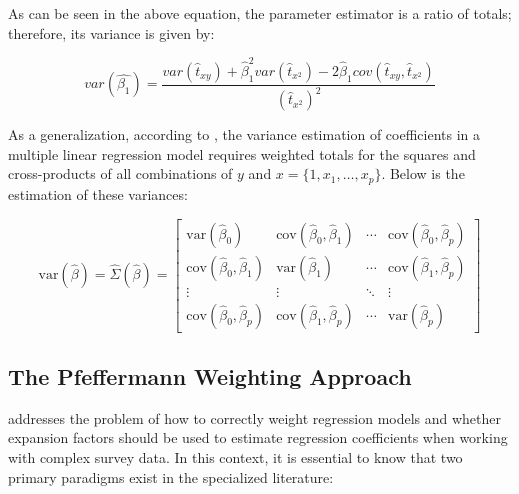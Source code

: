 \documentclass[
  12pt,
]{book}
\begin{document}
As can be seen in the above equation, the parameter estimator is a ratio of totals; therefore, its variance is given by:

\[
var\left(\hat{\beta_{1}}\right)  =  \frac{var\left(\hat{t}_{xy}\right)+\hat{\beta}_{1}^{2}var\left(\hat{t}_{x^{2}}\right)-2\hat{\beta}_{1}cov\left(\hat{t}_{xy},\hat{t}_{x^{2}}\right)}{\left(\hat{t}_{x^{2}}\right)^{2}}
\]

As a generalization, according to \citet{kish1974inference}, the variance estimation of coefficients in a multiple linear regression model requires weighted totals for the squares and cross-products of all combinations of \(y\) and \(x = \{1, x_{1}, \ldots, x_{p}\}\). Below is the estimation of these variances:

\[
\text{var}\left(\hat{\beta}\right) = \hat{\Sigma}\left(\hat{\beta}\right) = 
\begin{bmatrix}
\text{var}\left(\hat{\beta}_{0}\right) & \text{cov}\left(\hat{\beta}_{0},\hat{\beta}_{1}\right) & \cdots & \text{cov}\left(\hat{\beta}_{0},\hat{\beta}_{p}\right) \\
\text{cov}\left(\hat{\beta}_{0},\hat{\beta}_{1}\right) & \text{var}\left(\hat{\beta}_{1}\right) & \cdots & \text{cov}\left(\hat{\beta}_{1},\hat{\beta}_{p}\right) \\
\vdots & \vdots & \ddots & \vdots \\
\text{cov}\left(\hat{\beta}_{0},\hat{\beta}_{p}\right) & \text{cov}\left(\hat{\beta}_{1},\hat{\beta}_{p}\right) & \cdots & \text{var}\left(\hat{\beta}_{p}\right)
\end{bmatrix}
\]

\hypertarget{the-pfeffermann-weighting-approach}{%
\subsection{The Pfeffermann Weighting Approach}\label{the-pfeffermann-weighting-approach}}

\citet{Heeringa_West_Berglund_2017} addresses the problem of how to correctly weight regression models and whether expansion factors should be used to estimate regression coefficients when working with complex survey data. In this context, it is essential to know that two primary paradigms exist in the specialized literature:
\end{document}
